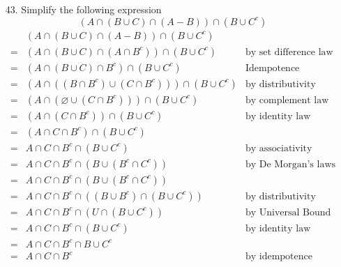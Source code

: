 \documentclass[12pt]{article}
\newcommand{\paren}[1]{\left( #1 \right)}
\begin{document}
\begin{enumerate}
\begin{enumerate}
                \item[43.] Simplify the following expression
                    \[
                    \paren{ A \cap \paren{B \cup C} \cap \paren{A - B}} \cap \paren{B \cup C^c}
                    \]
                    \begin{align*}
                        &\paren{ A \cap \paren{B \cup C} \cap \paren{A - B}} \cap \paren{B \cup C^c}\\
                        =&\paren{ A \cap \paren{B \cup C} \cap \paren{A \cap B^c}} \cap \paren{B \cup C^c} & \text{by set difference law}\\
                        =&\paren{A \cap \paren{B \cup C} \cap B^c} \cap \paren{B \cup C^c} & \text{Idempotence} \\
                        =&\paren{A \cap \paren{(B \cap B^c) \cup (C \cap B^c)}} \cap \paren{B \cup C^c} & \text{by distributivity} \\
                        =&\paren{A \cap \paren{\varnothing \cup (C \cap B^c)}} \cap \paren{B \cup C^c} & \text{by complement law }\\
                        =&\paren{A \cap (C \cap B^c)} \cap \paren{B \cup C^c} & \text{by identity law} \\
                        =&\paren{A \cap C \cap B^c} \cap \paren{B \cup C^c} \\
                        =& A \cap C \cap B^c \cap \paren{B \cup C^c} & \text{by associativity} \\
                        =& A \cap C \cap B^c \cap \paren{B \cup (B^c \cap C^c)} & \text{by De Morgan's laws} \\
                        =& A \cap C \cap B^c \cap \paren{B \cup (B^c \cap C^c)} \\
                        =& A \cap C \cap B^c \cap \paren{(B \cup B^c) \cap (B \cup C^c)} & \text{by distributivity} \\
                        =& A \cap C \cap B^c \cap \paren{U \cap (B \cup C^c)} & \text{by Universal Bound } \\
                        =& A \cap C \cap B^c \cap (B \cup C^c) & \text{by identity law} \\
                        =& A \cap C \cap B^c \cap B \cup C^c \\
                        =& A \cap C \cap B^c & \text{by idempotence}\\
                    \end{align*}
                

\end{enumerate}
\end{enumerate}
\end{document}
